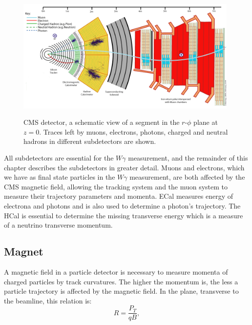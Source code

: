\begin{figure}[htb]
  \begin{center}
    {\includegraphics[width=0.98\textwidth]{../figs/Exp/CMS_Slice.png}}
    \caption{CMS detector, a schematic view of a segment in the $r$-$\phi$ plane at $z=0$. Traces left by muons, electrons, photons, charged and neutral hadrons in different subdetectors are shown.}
    \label{fig:CMS_slice}
  \end{center}
\end{figure}

All subdetectors are essential for the $W\gamma$ measurement, and the remainder of this chapter describes the subdetectors in greater detail. Muons and electrons, which we have as final state particles in the $W\gamma$ measurement, are both affected by the CMS magnetic field, allowing the tracking system and the muon system to measure their trajectory parameters and momenta. ECal measures energy of electrona and photons and is also used to determine a photon's trajectory. The HCal is essential to determine the missing transverse energy which is a measure of a neutrino transverse momentum.    

\clearpage

\subsection{Magnet}

A magnetic field in a particle detector is necessary to measure momenta of charged particles by track curvatures. The higher the momentum is, the less a particle trajectory is affected by the magnetic field. In the plane, transverse to the beamline, this relation is:
\begin{equation}
  R=\frac{P_T}{qB},
\end{equation} 

